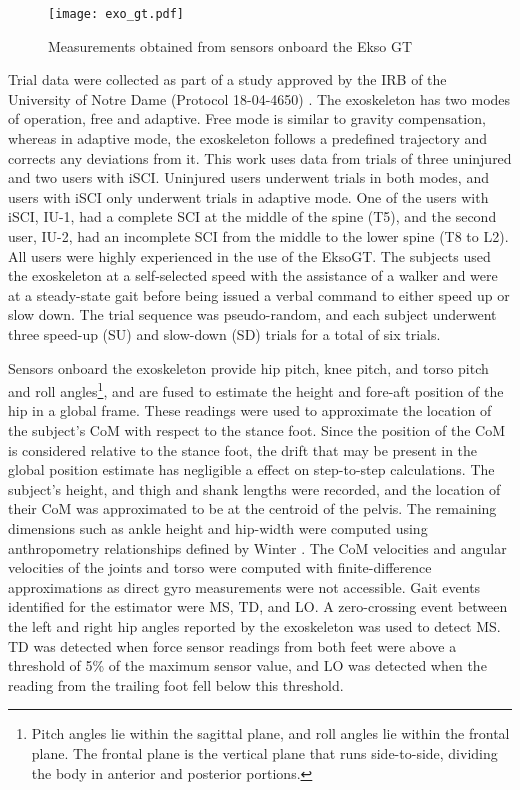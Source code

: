\begin{figure}
	\centering
	\texttt{[image: exo\_gt.pdf]}
	\vspace{-1em}
	\caption[Measurements obtained from sensors onboard the Ekso GT]{Measurements obtained from sensors onboard the Ekso GT \cite{eksoOperator}}\label{fig:exoOperator}
	\vspace{-1em}
\end{figure}

Trial data were collected as part of a study approved by the IRB of the University of Notre Dame (Protocol 18-04-4650) \cite{gambon2020effects}. The exoskeleton has two modes of operation, free and adaptive. Free mode is similar to gravity compensation, whereas in adaptive mode, the exoskeleton follows a predefined trajectory and corrects any deviations from it. This work uses data from trials of three uninjured and two users with iSCI. Uninjured users underwent trials in both modes, and users with iSCI only underwent trials in adaptive mode. One of the users with iSCI, IU-1, had a complete SCI at the middle of the spine (T5), and the second user, IU-2, had an incomplete SCI from the middle to the lower spine (T8 to L2). All users were highly experienced in the use of the EksoGT. The subjects used the exoskeleton at a self-selected speed with the assistance of a walker and were at a steady-state gait before being issued a verbal command to either speed up or slow down. The trial sequence was pseudo-random, and each subject underwent three speed-up (SU) and slow-down (SD) trials for a total of six trials.

Sensors onboard the exoskeleton provide hip pitch, knee pitch, and torso pitch and roll angles\footnote{Pitch angles lie within the sagittal plane, and roll angles lie within the frontal plane. The frontal plane is the vertical plane that runs side-to-side, dividing the body in anterior and posterior portions.}, and are fused to estimate the height and fore-aft position of the hip in a global frame. These readings were used to approximate the location of the subject's CoM with respect to the stance foot. Since the position of the CoM is considered relative to the stance foot, the drift that may be present in the global position estimate has negligible a effect on step-to-step calculations. The subject's height, and thigh and shank lengths were recorded, and the location of their CoM was approximated to be at the centroid of the pelvis. The remaining dimensions such as ankle height and hip-width were computed using anthropometry relationships defined by Winter \cite{winter2009biomechanics}. The CoM velocities and angular velocities of the joints and torso were computed with finite-difference approximations as direct gyro measurements were not accessible. Gait events identified for the estimator were MS, TD, and LO. A zero-crossing event between the left and right hip angles reported by the exoskeleton was used to detect MS. TD was detected when force sensor readings from both feet were above a threshold of 5\% of the maximum sensor value, and LO was detected when the reading from the trailing foot fell below this threshold. 

